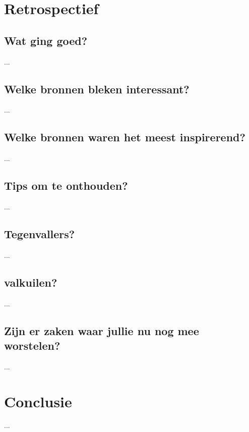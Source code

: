 \documentclass[fleqn,10pt]{voorstel}
\begin{document}
\section{Retrospectief}
\subsection{Wat ging goed?}
...
\subsection{Welke bronnen bleken interessant?}
...
\subsection{Welke bronnen waren het meest inspirerend?}
...
\subsection{Tips om te onthouden?}
...
\subsection{Tegenvallers?}
...
\subsection{valkuilen?}
...
\subsection{Zijn er zaken waar jullie nu nog mee worstelen?}
...

\section{Conclusie}
...




\end{document}
